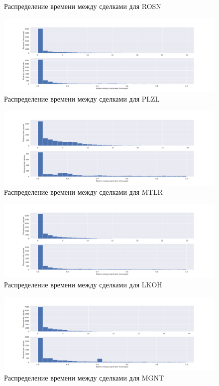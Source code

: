 \begin{appendices}
\begin{figure}
            \caption{Распределение времени между сделками для ROSN}
            \label{app}
        \end{figure}
        \begin{figure}
                \includegraphics[scale=0.35]{fig/timedistr/SE/PLZL.pdf}
                \caption{Распределение времени между сделками для PLZL}
                \label{app}
        \end{figure}
        \begin{figure}
                \includegraphics[scale=0.35]{fig/timedistr/SE/MTLR.pdf}
                \caption{Распределение времени между сделками для MTLR}
                \label{app}
        \end{figure}
        \begin{figure}
            \includegraphics[scale=0.35]{fig/timedistr/SE/LKOH.pdf}
            \caption{Распределение времени между сделками для LKOH}
            \label{app}
        \end{figure}
        \begin{figure}
                \includegraphics[scale=0.35]{fig/timedistr/SE/MGNT.pdf}
                \caption{Распределение времени между сделками для MGNT}
                \label{app}
        \end{figure}


\end{appendices}
